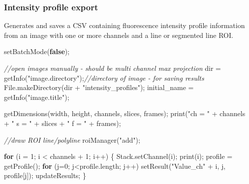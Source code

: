 \documentclass[
  12pt,
  a4paper,
]{book}
\newenvironment{Shaded}{}{}
\newcommand{\CommentTok}[1]{\textcolor[rgb]{0.38,0.63,0.69}{\textit{#1}}}
\newcommand{\ControlFlowTok}[1]{\textcolor[rgb]{0.00,0.44,0.13}{\textbf{#1}}}
\newcommand{\DecValTok}[1]{\textcolor[rgb]{0.25,0.63,0.44}{#1}}
\newcommand{\KeywordTok}[1]{\textcolor[rgb]{0.00,0.44,0.13}{\textbf{#1}}}
\newcommand{\NormalTok}[1]{#1}
\newcommand{\OperatorTok}[1]{\textcolor[rgb]{0.40,0.40,0.40}{#1}}
\newcommand{\StringTok}[1]{\textcolor[rgb]{0.25,0.44,0.63}{#1}}
\begin{document}
\hypertarget{intensity-profile-export}{%
\subsubsection{Intensity profile export}\label{intensity-profile-export}}

Generates and saves a CSV containing fluorescence intensity profile information from an image with one or more channels and a line or segmented line ROI.

\begin{Shaded}
\begin{Highlighting}[]
\NormalTok{setBatchMode}\OperatorTok{(}\KeywordTok{false}\OperatorTok{);}

\CommentTok{//open images manually {-} should be multi channel max projection}
\NormalTok{dir }\OperatorTok{=}\NormalTok{ getInfo}\OperatorTok{(}\StringTok{"image.directory"}\OperatorTok{);}\CommentTok{//directory of image {-} for saving results}
\NormalTok{File}\OperatorTok{.}\NormalTok{makeDirectory}\OperatorTok{(}\NormalTok{dir }\OperatorTok{+} \StringTok{"intensity\_profiles"}\OperatorTok{);}
\NormalTok{initial\_name }\OperatorTok{=}\NormalTok{ getInfo}\OperatorTok{(}\StringTok{"image.title"}\OperatorTok{);}

\NormalTok{getDimensions}\OperatorTok{(}\NormalTok{width}\OperatorTok{,}\NormalTok{ height}\OperatorTok{,}\NormalTok{ channels}\OperatorTok{,}\NormalTok{ slices}\OperatorTok{,}\NormalTok{ frames}\OperatorTok{);}
\NormalTok{print}\OperatorTok{(}\StringTok{"ch = "} \OperatorTok{+}\NormalTok{ channels }\OperatorTok{+} \StringTok{" s = "} \OperatorTok{+}\NormalTok{ slices }\OperatorTok{+} \StringTok{" f = "} \OperatorTok{+}\NormalTok{ frames}\OperatorTok{);}

\CommentTok{//draw ROI line/polyline}
\NormalTok{roiManager}\OperatorTok{(}\StringTok{"add"}\OperatorTok{);}

\ControlFlowTok{for} \OperatorTok{(}\NormalTok{i }\OperatorTok{=} \DecValTok{1}\OperatorTok{;}\NormalTok{ i }\OperatorTok{\textless{}}\NormalTok{ channels }\OperatorTok{+} \DecValTok{1}\OperatorTok{;}\NormalTok{ i}\OperatorTok{++)} \OperatorTok{\{}
\NormalTok{    Stack}\OperatorTok{.}\NormalTok{setChannel}\OperatorTok{(}\NormalTok{i}\OperatorTok{);}
\NormalTok{    print}\OperatorTok{(}\NormalTok{i}\OperatorTok{);}
\NormalTok{    profile }\OperatorTok{=}\NormalTok{ getProfile}\OperatorTok{();}
    \ControlFlowTok{for} \OperatorTok{(}\NormalTok{j}\OperatorTok{=}\DecValTok{0}\OperatorTok{;}\NormalTok{ j}\OperatorTok{\textless{}}\NormalTok{profile}\OperatorTok{.}\NormalTok{length}\OperatorTok{;}\NormalTok{ j}\OperatorTok{++)}
\NormalTok{      setResult}\OperatorTok{(}\StringTok{"Value\_ch"} \OperatorTok{+}\NormalTok{ i}\OperatorTok{,}\NormalTok{ j}\OperatorTok{,}\NormalTok{ profile}\OperatorTok{[}\NormalTok{j}\OperatorTok{]);}
\NormalTok{    updateResults}\OperatorTok{;}
\OperatorTok{\}}


\end{Highlighting}
\end{Shaded}
\end{document}
